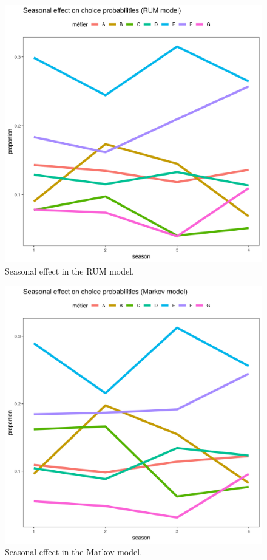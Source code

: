\documentclass[12pt, halfline, a4paper]{ouparticle}
\begin{document}
\begin{figure}[!ht]
	\centering
	\includegraphics[width=1\linewidth]{figures/RUM_metier_seasonal_effect}
	\caption{Seasonal effect in the RUM model.} 
	\label{fig:RUM_Seas}
\end{figure}	

\begin{figure}[!ht]
	\centering
	\includegraphics[width=1\linewidth]{figures/Markov_metier_seasonal_effect}
	\caption{Seasonal effect in the Markov model.} 
	\label{fig:Markov_Seas}
\end{figure}	

\renewcommand{\thefigure}{\@arabic\c@figure}


\end{document}
